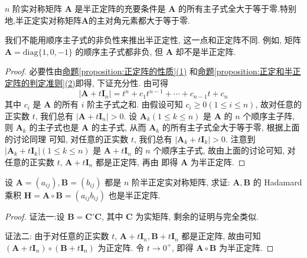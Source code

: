 \documentclass[../../main.tex]{subfiles}
\begin{document}
\begin{proposition}\label{proposition:半正定阵关于顺序主子式的性质}
\(n\) 阶实对称矩阵 \(\boldsymbol{A}\) 是半正定阵的充要条件是 \(\boldsymbol{A}\) 的所有主子式全大于等于零.特别地,半正定实对称矩阵$\boldsymbol{A}$的主对角元素都大于等于零.
\end{proposition}
\begin{remark}
我们不能用顺序主子式的非负性来推出半正定性, 这一点和正定阵不同. 例如, 矩阵 \(\boldsymbol{A}=\text{diag}\{1,0,-1\}\) 的顺序主子式都非负, 但 \(\boldsymbol{A}\) 却不是半正定阵. 
\end{remark}
\begin{proof}
必要性由\hyperref[proposition:正定阵的性质]{命题\ref{proposition:正定阵的性质}(1)} 和\hyperref[proposition:正定和半正定阵的判定准则]{命题\ref{proposition:正定和半正定阵的判定准则}(2)}即得, 下证充分性. 由可得
\[|\boldsymbol{A}+t\boldsymbol{I}_n|=t^n + c_1t^{n - 1}+\cdots + c_{n - 1}t + c_n\]
其中 \(c_i\) 是 \(\boldsymbol{A}\) 的所有 \(i\) 阶主子式之和. 由假设可知 \(c_i\geq0(1\leq i\leq n)\), 故对任意的正实数 \(t\), 我们总有 \(|\boldsymbol{A}+t\boldsymbol{I}_n|>0\). 设 \(\boldsymbol{A}_k(1\leq k\leq n)\) 是 \(\boldsymbol{A}\) 的 \(n\) 个顺序主子阵, 则 \(\boldsymbol{A}_k\) 的主子式也是 \(\boldsymbol{A}\) 的主子式, 从而 \(\boldsymbol{A}_k\) 的所有主子式全大于等于零, 根据上面的讨论同理 可知, 对任意的正实数 \(t\), 我们总有 \(|\boldsymbol{A}_k + t\boldsymbol{I}_k|>0\). 注意到 \(|\boldsymbol{A}_k + t\boldsymbol{I}_k|(1\leq k\leq n)\) 是 \(\boldsymbol{A}+t\boldsymbol{I}_n\) 的 \(n\) 个顺序主子式, 故由上面的讨论可知, 对任意的正实数 \(t\), \(\boldsymbol{A}+t\boldsymbol{I}_n\) 都是正定阵, 再由 即得 \(\boldsymbol{A}\) 为半正定阵. 
\end{proof}

\begin{proposition}\label{proposition:半正定阵的Hadamard乘积性质}
设 \(\boldsymbol{A}=(a_{ij}),\boldsymbol{B}=(b_{ij})\) 都是 \(n\) 阶半正定实对称矩阵, 求证: \(\boldsymbol{A},\boldsymbol{B}\) 的 Hadamard 乘积 \(\boldsymbol{H}=\boldsymbol{A}\circ\boldsymbol{B}=(a_{ij}b_{ij})\) 也是半正定阵.
\end{proposition}
\begin{proof}
{\color{blue}证法一:}设 \(\boldsymbol{B}=\boldsymbol{C}'\boldsymbol{C}\), 其中 \(\boldsymbol{C}\) 为实矩阵, 剩余的证明与完全类似.

{\color{blue}证法二:} 由于对任意的正实数 \(t\), \(\boldsymbol{A}+t\boldsymbol{I}_n,\boldsymbol{B}+t\boldsymbol{I}_n\) 都是正定阵, 故由可知 \((\boldsymbol{A}+t\boldsymbol{I}_n)\circ(\boldsymbol{B}+t\boldsymbol{I}_n)\) 为正定阵. 令 \(t\to0^+\), 即得 \(\boldsymbol{A}\circ\boldsymbol{B}\) 为半正定阵.
\end{proof}
\end{document}
